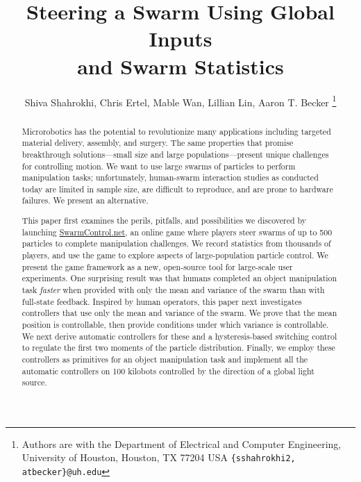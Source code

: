 \documentclass[conference]{IEEEtran}
\title{\LARGE \bf Steering a Swarm Using Global Inputs\\ and Swarm Statistics}
\author{Shiva Shahrokhi, Chris Ertel, Mable Wan, Lillian Lin, Aaron T. Becker%
\thanks{Authors are with the Department of Electrical and Computer Engineering,  University of Houston, Houston, TX 77204 USA        {\tt\small  \{sshahrokhi2, atbecker\}@uh.edu}}
}
\begin{document}
\maketitle
\thispagestyle{empty}
\pagestyle{empty}
\begin{abstract}
Microrobotics has the potential to revolutionize many applications including targeted material delivery, assembly, and surgery.  The same properties that promise breakthrough solutions---small size and large populations---present unique challenges for controlling motion. We want to use large swarms of particles to perform manipulation tasks; unfortunately, human-swarm interaction studies as conducted today are limited in sample size, are difficult to reproduce, and are prone to hardware failures. We present an alternative.

This paper first examines the perils, pitfalls, and possibilities we discovered by launching \href{http://www.swarmcontrol.net}{SwarmControl.net}, an online game where players steer swarms of up to 500 particles to complete manipulation challenges. We record statistics from thousands of players, and use the game to explore aspects of large-population particle control. We present the game framework as a new, open-source tool for large-scale user experiments. One surprising result was that humans completed an object manipulation task \emph{faster} when provided with only the mean and variance of the swarm than with full-state feedback. Inspired by human operators, this paper next investigates controllers that use only the mean and variance of the swarm. We prove that the mean position is controllable, then provide conditions under which variance is controllable.  We next derive automatic controllers for these and a hysteresis-based switching control to regulate the first two moments of the particle distribution.  Finally, we employ these controllers as primitives for an object manipulation task and implement all the automatic controllers on 100 kilobots controlled by the direction of a global light source.
\end{abstract}





%









\end{document}

